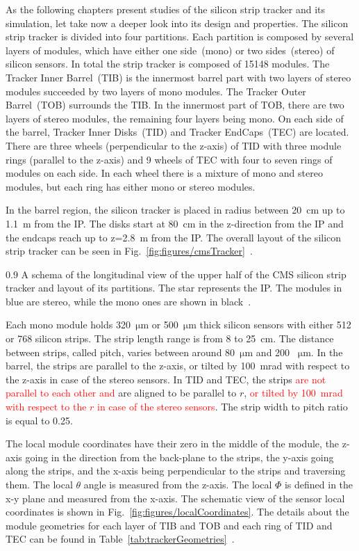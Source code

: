 As the following chapters present studies of the silicon strip tracker and its simulation, let take now a deeper look into its design and properties. The silicon strip tracker is divided into four partitions. Each partition is composed by several layers of modules, which have either one side~(mono) or two sides~(stereo) of silicon sensors. In total the strip tracker is composed of 15148 modules. The Tracker Inner Barrel~(TIB) is the innermost barrel part with two layers of stereo modules succeeded by two layers of mono modules. The Tracker Outer Barrel~(TOB) surrounds the TIB. In the innermost part of TOB, there are two layers of stereo modules, the remaining four layers being mono. On each side of the barrel, Tracker Inner Disks~(TID) and Tracker EndCaps~(TEC) are located. There are three wheels (perpendicular to the z-axis) of TID with three module rings (parallel to the z-axis) and 9 wheels of TEC with four to seven rings of modules on each side. In each wheel there is a mixture of mono and stereo modules, but each ring has either mono or stereo modules. 

In the barrel region, the silicon tracker is placed in radius between 20~cm up to 1.1~m from the IP. The disks start at 80~cm in the z-direction from the IP and the endcaps reach up to z=2.8~m from the IP. The overall layout of the silicon strip tracker can be seen in Fig.~\ref{fig:figures/cmsTracker}~\cite{Chatrchyan:2014fea}.

                 {0.9}       
                 {A schema of the longitudinal view of the upper half of the CMS silicon strip tracker and layout of its partitions. The star represents the IP. The modules in blue are stereo, while the mono ones are shown in black~\cite{Chatrchyan:2014fea}. }

Each mono module holds 320~$\mathrm{\mu m}$ or 500~$\mathrm{\mu m}$ thick silicon sensors with either 512 or 768 silicon strips.  The strip length range is from 8 to 25~cm. The distance between strips, called pitch, varies between around 80~$\mathrm{\mu m}$ and 200 ~$\mathrm{\mu m}$.  In the barrel, the strips are parallel to the z-axis, or tilted by 100~mrad with respect to the z-axis in case of the stereo sensors. In TID and TEC, the strips \textcolor{red}{are not parallel to each other and} are aligned to be parallel to $r$, \textcolor{red}{or tilted by 100~mrad with respect to the $r$ in case of the stereo sensors}. The strip width to pitch ratio is equal to 0.25.

The local module coordinates have their zero in the middle of the module, the z-axis going in the direction from the back-plane to the strips, the y-axis going along the strips, and the x-axis being perpendicular to the strips and traversing them. The local $\theta$ angle is measured from the z-axis. The local $\Phi$ is defined in the x-y plane and measured from the x-axis. The schematic view of the sensor local coordinates is shown in Fig.~\ref{fig:figures/localCoordinates}. The details about the module geometries for each layer of TIB and TOB and each ring of TID and TEC can be found in Table~\ref{tab:trackerGeometries}~\cite{website:hephyPage}.


